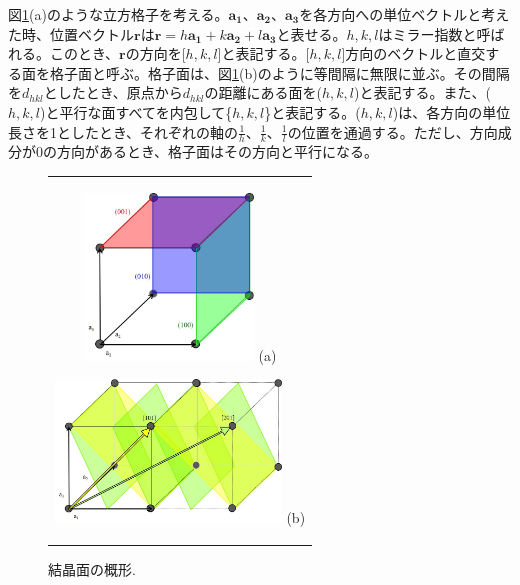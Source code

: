 \documentclass[11pt,a4j,uplatex]{jsarticle}
\begin{document}
図\ref{a1}(a)のような立方格子を考える。$\bm{a_1}、\bm{a_2}、\bm{a_3}$を各方向への単位ベクトルと考えた時、位置ベクトル$\bm{r}$は$\bm{r}=h\bm{a_1}+k\bm{a_2}+l\bm{a_3}$と表せる。$h,k,l$はミラー指数と呼ばれる。このとき、$\bm{r}$の方向を[$h,k,l$]と表記する。[$h,k,l$]方向のベクトルと直交する面を格子面と呼ぶ。格子面は、図\ref{a1}(b)のように等間隔に無限に並ぶ。その間隔を$d_{hkl}$としたとき、原点から$d_{hkl}$の距離にある面を($h,k,l$)と表記する。また、($h,k,l$)と平行な面すべてを内包して\{$h,k,l$\}と表記する。($h,k,l$)は、各方向の単位長さを1としたとき、それぞれの軸の$\frac{1}{h}$、$\frac{1}{k}$、$\frac{1}{l}$の位置を通過する。ただし、方向成分が0の方向があるとき、格子面はその方向と平行になる。
\begin{figure}[ht]
 \centering
 \begin{tabular}{c}

  \begin{minipage}{0.5\hsize}
   \centering
   \includegraphics[clip, width=4.5cm]{a1.jpg}
   \hspace{2cm} (a)
  \end{minipage}

  \begin{minipage}{0.5\hsize}
   \centering
   \includegraphics[clip, width=6cm]{a2.jpg}
   \hspace{2cm} (b)
  \end{minipage}
 \end{tabular}
 \caption{結晶面の概形.}
 \label{a1}

\end{figure}
\end{document}
